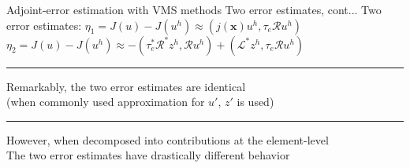 \documentclass[fleqn]{beamer}
\newcommand{\bs}[1]{\boldsymbol{#1}}
\begin{document}

\begin{frame}{Adjoint-error estimation with VMS methods}
{Two error estimates, cont...}
Two error estimates:
$\eta_1 = J(u) - J(u^h) \approx (j(\bs{x}) u^h, \tau_e \mathcal{R} u^h)$ \\ [4pt]
$\eta_2 = J(u) - J(u^h) \approx -(\tau_e^* \mathcal{R}^* z^h, \mathcal{R} u^h) + 
(\mathcal{L}^* z^h, \tau_e \mathcal{R} u^h)$ \\ [8pt]
\hrule
\vspace{1em}
Remarkably, the two error estimates are identical \\
(when commonly used approximation for $u'$, $z'$ is used) \\ [8pt]
\hrule
\vspace{1em}
However, when decomposed into contributions at the element-level \\
The two error estimates have drastically different behavior
\end{frame}

\end{document}
